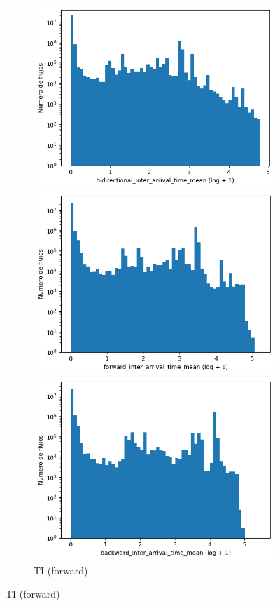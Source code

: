 \begin{figure}[H]
\begin{subfigure}[b]{0.32\textwidth}
        \includegraphics[width=\linewidth]{media/packet_pincer_toniot/bidirectional_inter_arrival_time_mean_log_x_log_y.png}
        \caption{TI (bidir.)}
        \includegraphics[width=\textwidth]{media/packet_pincer_toniot/forward_inter_arrival_time_mean_log_x_log_y.png}
        \caption{TI (forward)}
        \includegraphics[width=\textwidth]{media/packet_pincer_toniot/backward_inter_arrival_time_mean_log_x_log_y.png}

\end{subfigure}
\end{figure}
